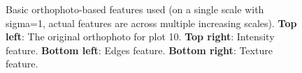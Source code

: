 \begin{figure}
\caption[Visualisation of basic orthophoto-based features (small
scale)]{\label{fig-basic-features-small}Basic orthophoto-based features
used (on a single scale with sigma=1, actual features are across
multiple increasing scales). \textbf{Top left}: The original orthophoto
for plot 10. \textbf{Top right}: Intensity feature. \textbf{Bottom
left}: Edges feature. \textbf{Bottom right}: Texture feature.}
\end{figure}

